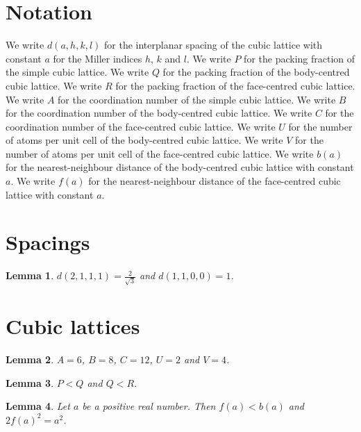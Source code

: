 \documentclass{article}
\newtheorem{lemma}{Lemma}
\begin{document}
\section{Notation}

We write $d(a,h,k,l)$ for the interplanar spacing of the cubic lattice with constant $a$ for the Miller indices $h$, $k$ and $l$.
We write $P$ for the packing fraction of the simple cubic lattice.
We write $Q$ for the packing fraction of the body-centred cubic lattice.
We write $R$ for the packing fraction of the face-centred cubic lattice.
We write $A$ for the coordination number of the simple cubic lattice.
We write $B$ for the coordination number of the body-centred cubic lattice.
We write $C$ for the coordination number of the face-centred cubic lattice.
We write $U$ for the number of atoms per unit cell of the body-centred cubic lattice.
We write $V$ for the number of atoms per unit cell of the face-centred cubic lattice.
We write $b(a)$ for the nearest-neighbour distance of the body-centred cubic lattice with constant $a$.
We write $f(a)$ for the nearest-neighbour distance of the face-centred cubic lattice with constant $a$.

\section{Spacings}

\begin{lemma}\label{spacing}
$d(2,1,1,1)=\frac{2}{\sqrt{3}}$ and $d(1,1,0,0)=1$.
\end{lemma}

\section{Cubic lattices}

\begin{lemma}\label{numbers}
$A=6$, $B=8$, $C=12$, $U=2$ and $V=4$.
\end{lemma}

\begin{lemma}\label{packing}
$P<Q$ and $Q<R$.
\end{lemma}

\begin{lemma}\label{neighbours}
Let $a$ be a positive real number. Then $f(a)<b(a)$ and $2f(a)^2=a^2$.
\end{lemma}
\end{document}
